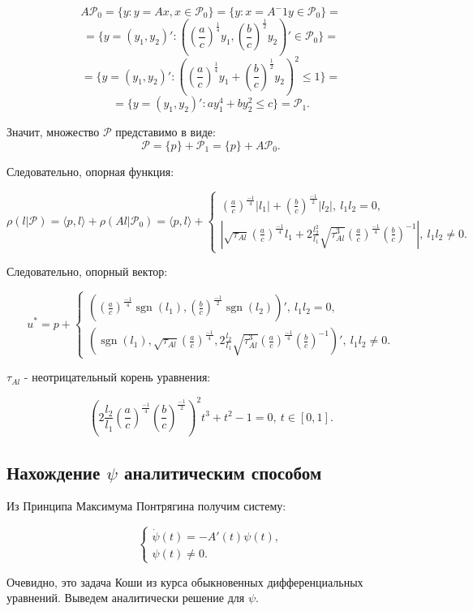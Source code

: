 \documentclass{article}
\theoremstyle{definition}
\newcommand{\sgn}{\mathop{\mathrm{sgn}}}
\begin{document}
$$A\mathcal{P}_0 = \{y: y = Ax, x \in \mathcal{P}_0\} = \{y: x = A^-1y \in \mathcal{P}_0 \} =$$
$$=\{y = (y_1,y_2)': ((\frac{a}{c})^\frac{1}{4}y_1, (\frac{b}{c})^\frac{1}{2}y_2)'
\in \mathcal{P}_0 \} =$$
$$=\{y = (y_1,y_2)': ((\frac{a}{c})^\frac{1}{4}y_1 + (\frac{b}{c})^\frac{1}{2}y_2)^2
\leqslant 1 \} =$$
$$= \{y = (y_1,y_2)': ay_1^4+by_2^2 \leqslant c \} = \mathcal{P}_1.$$

Значит, множество $\mathcal{P}$ представимо в виде:
$$\mathcal{P} = \{p\}+\mathcal{P}_1 = \{p\}+A\mathcal{P}_0.$$

Следовательно, опорная функция: 

$$\rho(l|\mathcal{P}) = \langle p, l \rangle + \rho(Al|\mathcal{P}_0) = 
\langle p, l \rangle +
\begin{cases}
    (\frac{a}{c})^\frac{-1}{4}|l_1| + (\frac{b}{c})^\frac{-1}{2}|l_2|,~ l_1l_2 = 0,\\
    |\sqrt{\tau_{Al}}(\frac{a}{c})^\frac{-1}{4}l_1 + 2\frac{l_2^2}{l_1}\sqrt{\tau_{Al}^3}(\frac{a}{c})^\frac{-1}{4}(\frac{b}{c})^{-1}|,~ l_1l_2 \neq 0.
  \end{cases}
$$

Следовательно, опорный вектор:

$$u^* = p + 
\begin{cases}
    ((\frac{a}{c})^\frac{-1}{4}\sgn(l_1), (\frac{b}{c})^\frac{-1}{2}\sgn(l_2))',~ l_1l_2 = 0,\\
    (\sgn(l_1), \sqrt{\tau_{Al}}(\frac{a}{c})^\frac{-1}{4}, 2\frac{l_2}{l_1}\sqrt{\tau_{Al}^3}(\frac{a}{c})^\frac{-1}{4}(\frac{b}{c})^{-1})',~ l_1l_2 \neq 0.
  \end{cases}
$$

$\tau_{Al}$ - неотрицательный корень уравнения:

$$(2\frac{l_2}{l_1}(\frac{a}{c})^\frac{-1}{4}(\frac{b}{c})^\frac{-1}{2})^2t^3+t^2-1 = 0,~ t \in [0,1].$$

\newpage

\subsection{Нахождение $\psi$ аналитическим способом}

Из Принципа Максимума Понтрягина получим систему:

$$
\begin{cases}
  \dot \psi(t) = -A'(t)\psi(t), \\
  \psi(t) \neq 0.
  \end{cases}
$$

Очевидно, это задача Коши из курса обыкновенных дифференциальных уравнений. Выведем аналитически решение для $\psi$.
\end{document}
